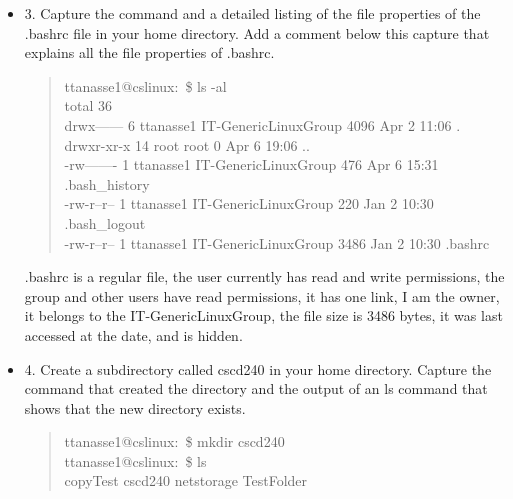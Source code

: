 \documentclass{article}
\begin{document}
\begin{itemize}
\begin{quote}
  \end{quote}
  [redacted to save paper]
  \item 3. Capture the command and a detailed listing of the file properties of the .bashrc file in your home directory. Add a comment below this capture that explains all the file properties of .bashrc.
  \begin{quote}
    ttanasse1@cslinux:~\$ ls -al\\
total 36\\
drwx------  6 ttanasse1 IT-GenericLinuxGroup 4096 Apr  2 11:06 .\\
drwxr-xr-x 14 root      root                    0 Apr  6 19:06 ..\\
-rw-------  1 ttanasse1 IT-GenericLinuxGroup  476 Apr  6 15:31 .bash\_history\\
-rw-r--r--  1 ttanasse1 IT-GenericLinuxGroup  220 Jan  2 10:30 .bash\_logout\\
-rw-r--r--  1 ttanasse1 IT-GenericLinuxGroup 3486 Jan  2 10:30 .bashrc\\
  \end{quote}
  .bashrc is a regular file, the user currently has read and write permissions, the group and other users have read permissions, it has one link, I am the owner, it belongs to the IT-GenericLinuxGroup, the file size is 3486 bytes, it was last accessed at the date, and is hidden.
  \item 4. Create a subdirectory called cscd240 in your home directory. Capture the command that created the directory and the output of an ls command that shows that the new directory exists. 
  \begin{quote}
    ttanasse1@cslinux:~\$ mkdir cscd240\\
ttanasse1@cslinux:~\$ ls\\
copyTest  cscd240  netstorage  TestFolder
  \end{quote}
\end{itemize}
\pagebreak
\end{document}
